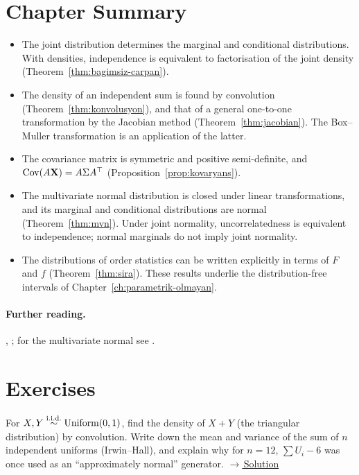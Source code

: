 \documentclass[main.tex]{subfiles}
\begin{document}
\section{Chapter Summary}
\begin{summary}
\begin{itemize}
  \item The joint distribution determines the marginal and conditional distributions. With densities, independence is equivalent to factorisation of the joint density (Theorem~\ref{thm:bagimsiz-carpan}).
  \item The density of an independent sum is found by convolution (Theorem~\ref{thm:konvolusyon}), and that of a general one-to-one transformation by the Jacobian method (Theorem~\ref{thm:jacobian}). The Box--Muller transformation is an application of the latter.
  \item The covariance matrix is symmetric and positive semi-definite, and $\operatorname{Cov}(A\mathbf{X})=A\Sigma A^\top$ (Proposition~\ref{prop:kovaryans}).
  \item The multivariate normal distribution is closed under linear transformations, and its marginal and conditional distributions are normal (Theorem~\ref{thm:mvn}). Under joint normality, uncorrelatedness is equivalent to independence; normal marginals do not imply joint normality.
  \item The distributions of order statistics can be written explicitly in terms of $F$ and $f$ (Theorem~\ref{thm:sira}). These results underlie the distribution-free intervals of Chapter~\ref{ch:parametrik-olmayan}.
\end{itemize}
\end{summary}

\paragraph{Further reading.} \cite[Chapter~4]{casella}, \cite[Chapters~2--3]{wasserman}; for the multivariate normal see \cite[Chapters~2--3]{seber}.

\section{Exercises}

\begin{exercise}\label{exr:04-1}
For $X,Y\overset{\text{i.i.d.}}{\sim}\text{Uniform}(0,1)$, find the density of $X+Y$ (the triangular distribution) by convolution. Write down the mean and variance of the sum of $n$ independent uniforms (Irwin--Hall), and explain why for $n=12$, $\sum U_i-6$ was once used as an ``approximately normal'' generator.
\hfill\hyperref[coz:04-1]{\footnotesize$\rightarrow$\,Solution}
\end{exercise}
\end{document}
